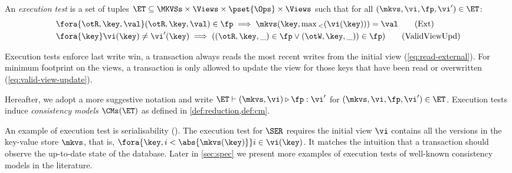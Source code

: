\begin{definition}
\label{def:execution.test}
An \emph{execution test} is a set of tuples $\ET \subseteq \MKVSs \times \Views \times \pset{\Ops} \times \Views$ 
such that for all $(\mkvs, \vi, \fp, \vi') \in \ET$:
\begin{align}
    & \fora{\otR, \key, \val} (\otR, \key, \val) \in \fp \implies \mkvs(\key, \max{}_{<}(\vi(\key))) = \val \tag{Ext} \label{eq:read-external} \\
    & \fora{\key} \vi(\key) \neq \vi'(\key) \implies
    ( (\otR, \key, \_) \in \fp \vee (\otW, \key, \_)) \in \fp) \tag{ValidViewUpd} \label{eq:valid-view-update}
\end{align}
\end{definition}

Execution tests enforce last write win,
\ie a transaction always reads the most recent writes from the initial view (\cref{eq:read-external}).
For minimum footprint on the views, a transaction is only allowed to update the view for those keys that have been read or overwritten (\cref{eq:valid-view-update}).


Hereafter, we adopt a more suggestive notation and write $\ET \vdash (\mkvs, \vi) \triangleright \fp: \vi'$ 
for $(\mkvs, \vi, \fp, \vi') \in \ET$.
Execution tests induce \emph{consistency models} \( \CMs(\ET) \) as defined in \cref{def:reduction,def:cm}.

An example of execution test is serialisability (\SER).
The execution test for \( \SER \) requires the initial view  \( \vi \) contains all the versions in the key-value store \( \mkvs \), that is, \( \fora{\key, i < \abs{\mkvs(\key)} } i \in \vi(\key)\).
It matches the intuition that a transaction should observe the up-to-date state of the database.
Later in \cref{sec:spec} we present more examples of execution tests of well-known consistency models in the literature. 


